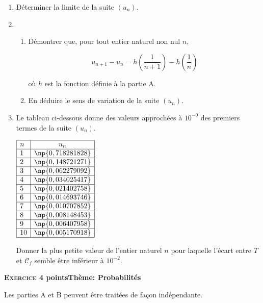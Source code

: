 \documentclass[11pt,a4paper,french]{article}
\begin{document}
\begin{enumerate}[resume]
\item Déterminer la limite de la suite $\left(u_n\right)$.
\item 
	\begin{enumerate}
		\item Démontrer que, pour tout entier naturel non nul $n$,
		
\[u_{n+1} - u_n = h\left(\dfrac{1}{n + 1}\right) - h\left(\dfrac{1}{n}\right) \]

où $h$ est la fonction définie à la partie A.
		\item En déduire le sens de variation de la suite $\left(u_n\right)$.
	\end{enumerate}
\item Le tableau ci-dessous donne des valeurs approchées à $10^{-9}$ des premiers termes de la suite $\left(u_n\right)$.

\begin{center}
$\begin{array}{|l|c|}\hline
n &u_n\\ \hline
1 &\np{0,718281828}\\ \hline
2 &\np{0,148721271}\\ \hline
3 &\np{0,062279092}\\ \hline
4 &\np{0,034025417}\\ \hline
5 &\np{0,021402758}\\ \hline
6 &\np{0,014693746}\\ \hline
7 &\np{0,010707852}\\ \hline
8 &\np{0,008148453}\\ \hline
9 &\np{0,006407958}\\ \hline
10 &\np{0,005170918}\\ \hline
\end{array}$
\end{center}

Donner la plus petite valeur de l'entier naturel $n$ pour laquelle l'écart entre $T$ et $\mathcal{C}_f$ semble être inférieur à $10^{-2}$.


\end{enumerate}

\bigskip

\textbf{\textsc{Exercice 4}  points\hfill Thème: Probabilités}

\bigskip

Les parties A et B peuvent être traitées de façon indépendante.

\medskip
\end{document}
